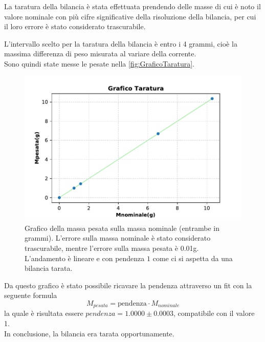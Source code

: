 {\fontsize{11}{14}\selectfont 

La taratura della bilancia è stata effettuata  prendendo delle masse di cui è noto il valore nominale con più cifre significative della risoluzione della bilancia, per cui il loro errore è stato considerato trascurabile. 
\par
L'intervallo scelto per la taratura della bilancia è entro i 4 grammi, cioè la massima differenza di peso misurata al variare della corrente.
\\
Sono quindi state messe le pesate nella \autoref{fig:GraficoTaratura}.
\par
\begin{figure}[H]
  \centering
  \includegraphics[width=13.5cm]{Figures/Grafico_Taratura.pdf}
  \caption{Grafico della massa pesata sulla massa nominale (entrambe in grammi). L'errore sulla massa nominale è stato considerato trascurabile, mentre l'errore sulla massa pesata è 0.01g. L'andamento è lineare e con pendenza $1$ come ci si aspetta da una bilancia tarata.}   
  \label{fig:GraficoTaratura}
\end{figure}
\par
Da questo grafico è stato possibile ricavare la pendenza attraverso un fit con la seguente formula
\begin{equation*}
    M_{pesata} = \text{pendenza}\cdot M_{nominale}
\end{equation*}
la quale è risultata essere $pendenza = 1.0000 \pm 0.0003$, compatibile con il valore 1. 
\\
In conclusione, la bilancia era tarata opportunamente.
\par}